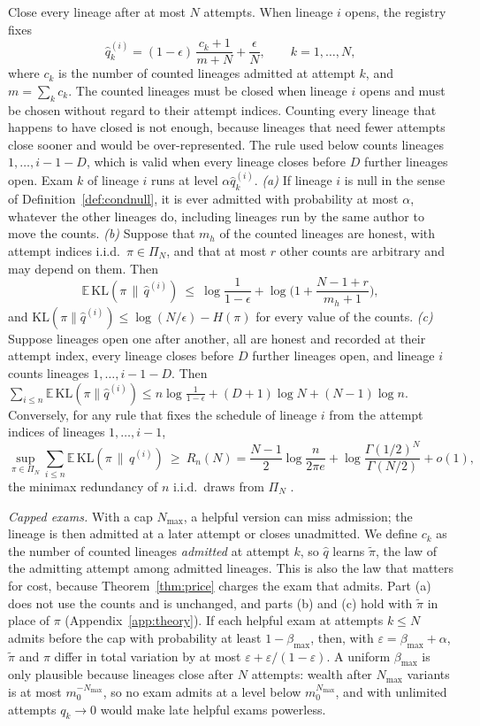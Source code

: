 \begin{theorem}\label{thm:learned}
Close every lineage after at most $N$ attempts. When lineage $i$ opens, the registry fixes
\[
\hat q^{(i)}_k=(1-\epsilon)\,\frac{c_k+1}{m+N}+\frac{\epsilon}{N},\qquad k=1,\dots,N,
\]
where $c_k$ is the number of counted lineages admitted at attempt $k$, and $m=\sum_kc_k$. The counted lineages must be closed when lineage $i$ opens and must be chosen without regard to their attempt indices. Counting every lineage that happens to have closed is not enough, because lineages that need fewer attempts close sooner and would be over-represented. The rule used below counts lineages $1,\dots,i-1-D$, which is valid when every lineage closes before $D$ further lineages open. Exam $k$ of lineage $i$ runs at level $\alpha\hat q^{(i)}_k$.
\emph{(a)} If lineage $i$ is null in the sense of Definition~\ref{def:condnull}, it is ever admitted with probability at most $\alpha$, whatever the other lineages do, including lineages run by the same author to move the counts.
\emph{(b)} Suppose that $m_h$ of the counted lineages are honest, with attempt indices i.i.d.\ $\pi\in\Pi_N$, and that at most $r$ other counts are arbitrary and may depend on them. Then
\[
\mathbb E\,\mathrm{KL}(\pi\,\|\,\hat q^{(i)})\ \le\ \log\frac1{1-\epsilon}+\log\Big(1+\frac{N-1+r}{m_h+1}\Big),
\]
and $\mathrm{KL}(\pi\|\hat q^{(i)})\le\log(N/\epsilon)-H(\pi)$ for every value of the counts.
\emph{(c)} Suppose lineages open one after another, all are honest and recorded at their attempt index, every lineage closes before $D$ further lineages open, and lineage $i$ counts lineages $1,\dots,i-1-D$. Then $\sum_{i\le n}\mathbb E\,\mathrm{KL}(\pi\|\hat q^{(i)})\le n\log\frac1{1-\epsilon}+(D+1)\log N+(N-1)\log n$. Conversely, for any rule that fixes the schedule of lineage $i$ from the attempt indices of lineages $1,\dots,i-1$,
\[\sup_{\pi\in\Pi_N}\sum_{i\le n}\mathbb E\,\mathrm{KL}(\pi\,\|\,q^{(i)})\ \ge\ R_n(N)=\frac{N-1}2\log\frac n{2\pi e}+\log\frac{\Gamma(1/2)^N}{\Gamma(N/2)}+o(1),\]
the minimax redundancy of $n$ i.i.d.\ draws from $\Pi_N$ \citep{xie1997minimax}.
\end{theorem}
\emph{Capped exams.} With a cap $N_{\max}$, a helpful version can miss admission; the lineage is then admitted at a later attempt or closes unadmitted. We define $c_k$ as the number of counted lineages \emph{admitted} at attempt $k$, so $\hat q$ learns $\tilde\pi$, the law of the admitting attempt among admitted lineages. This is also the law that matters for cost, because Theorem~\ref{thm:price} charges the exam that admits. Part (a) does not use the counts and is unchanged, and parts (b) and (c) hold with $\tilde\pi$ in place of $\pi$ (Appendix~\ref{app:theory}). If each helpful exam at attempts $k\le N$ admits before the cap with probability at least $1-\beta_{\max}$, then, with $\varepsilon=\beta_{\max}+\alpha$, $\tilde\pi$ and $\pi$ differ in total variation by at most $\varepsilon+\varepsilon/(1-\varepsilon)$. A uniform $\beta_{\max}$ is only plausible because lineages close after $N$ attempts: wealth after $N_{\max}$ variants is at most $m_0^{-N_{\max}}$, so no exam admits at a level below $m_0^{N_{\max}}$, and with unlimited attempts $q_k\to0$ would make late helpful exams powerless.


